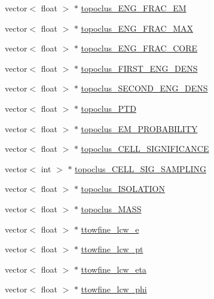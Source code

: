 \begin{DoxyCompactItemize}
\item 
vector$<$ float $>$ $\ast$ \hyperlink{classXMLWriter_abdf2ff30de6af7bbad3cc6ef079aa701}{topoclus\+\_\+\+E\+N\+G\+\_\+\+F\+R\+A\+C\+\_\+\+EM}
\item 
vector$<$ float $>$ $\ast$ \hyperlink{classXMLWriter_a113e32eecb9645009c94def9da3feb1a}{topoclus\+\_\+\+E\+N\+G\+\_\+\+F\+R\+A\+C\+\_\+\+M\+AX}
\item 
vector$<$ float $>$ $\ast$ \hyperlink{classXMLWriter_a3e7f288c86cba5beb5d4439625ce3249}{topoclus\+\_\+\+E\+N\+G\+\_\+\+F\+R\+A\+C\+\_\+\+C\+O\+RE}
\item 
vector$<$ float $>$ $\ast$ \hyperlink{classXMLWriter_a230e9462db80fc7f19c00feb02531331}{topoclus\+\_\+\+F\+I\+R\+S\+T\+\_\+\+E\+N\+G\+\_\+\+D\+E\+NS}
\item 
vector$<$ float $>$ $\ast$ \hyperlink{classXMLWriter_a857631eb88f71104377a8c858150dc04}{topoclus\+\_\+\+S\+E\+C\+O\+N\+D\+\_\+\+E\+N\+G\+\_\+\+D\+E\+NS}
\item 
vector$<$ float $>$ $\ast$ \hyperlink{classXMLWriter_a5c8198290ca1ab66dbdbd51f14d8febc}{topoclus\+\_\+\+P\+TD}
\item 
vector$<$ float $>$ $\ast$ \hyperlink{classXMLWriter_af1adc447e48cbea0f61cd4d9d13e121c}{topoclus\+\_\+\+E\+M\+\_\+\+P\+R\+O\+B\+A\+B\+I\+L\+I\+TY}
\item 
vector$<$ float $>$ $\ast$ \hyperlink{classXMLWriter_a1fe6821b4299b7cc83e8b29afce1f668}{topoclus\+\_\+\+C\+E\+L\+L\+\_\+\+S\+I\+G\+N\+I\+F\+I\+C\+A\+N\+CE}
\item 
vector$<$ int $>$ $\ast$ \hyperlink{classXMLWriter_a89526969d1126020910636bf9aa2b1a1}{topoclus\+\_\+\+C\+E\+L\+L\+\_\+\+S\+I\+G\+\_\+\+S\+A\+M\+P\+L\+I\+NG}
\item 
vector$<$ float $>$ $\ast$ \hyperlink{classXMLWriter_a0f806b1698c9bb84b062fe073c2a4b8c}{topoclus\+\_\+\+I\+S\+O\+L\+A\+T\+I\+ON}
\item 
vector$<$ float $>$ $\ast$ \hyperlink{classXMLWriter_a7e9f8b3c92f9df338390334651f4c0ce}{topoclus\+\_\+\+M\+A\+SS}
\item 
vector$<$ float $>$ $\ast$ \hyperlink{classXMLWriter_a58407ff1e02b4c106d15c12e8a15f5e8}{ttowfine\+\_\+lcw\+\_\+e}
\item 
vector$<$ float $>$ $\ast$ \hyperlink{classXMLWriter_aaed5e3098468cd1641c80521bf37fb3e}{ttowfine\+\_\+lcw\+\_\+pt}
\item 
vector$<$ float $>$ $\ast$ \hyperlink{classXMLWriter_acdded72758d91f5a9914699b0b3a3453}{ttowfine\+\_\+lcw\+\_\+eta}
\item 
vector$<$ float $>$ $\ast$ \hyperlink{classXMLWriter_aff2f518f90e1ed27f75cb9e04e5716ff}{ttowfine\+\_\+lcw\+\_\+phi}

\end{DoxyCompactItemize}
